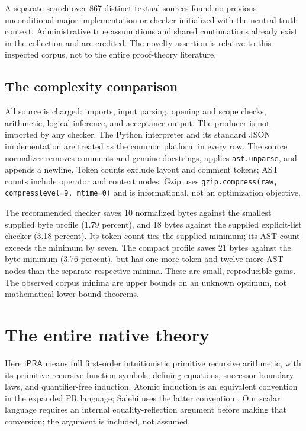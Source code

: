 \documentclass[11pt,letterpaper]{article}
\theoremstyle{definition}\newtheorem{definition}[theorem]{Definition}
\theoremstyle{remark}\newtheorem{remark}[theorem]{Remark}
\newcommand{\ipra}{\mathsf{iPRA}}
\begin{document}
A separate search over 867 distinct textual sources found no previous
unconditional-major implementation or checker initialized with the
neutral truth context. Administrative true assumptions and shared
continuations already exist in the collection and are credited. The
novelty assertion is relative to this inspected corpus, not to the entire
proof-theory literature.

\subsection{The complexity comparison}



All source is charged: imports, input parsing, opening and scope checks,
arithmetic, logical inference, and acceptance output. The producer is
not imported by any checker. The Python interpreter and its standard
JSON implementation are treated as the common platform in every row.
The source normalizer removes comments and genuine docstrings, applies
\texttt{ast.unparse}, and appends a newline. Token counts exclude layout
and comment tokens; AST counts include operator and context nodes.
Gzip uses \texttt{gzip.compress(raw, compresslevel=9, mtime=0)} and is
informational, not an optimization objective.

The recommended checker saves 10 normalized bytes against the smallest
supplied byte profile (1.79 percent), and 18 bytes against the supplied
explicit-list checker (3.18 percent). Its token count ties the supplied
minimum; its AST count exceeds the minimum by seven. The compact profile
saves 21 bytes against the byte minimum (3.76 percent), but has one more
token and twelve more AST nodes than the separate respective minima.
These are small, reproducible gains. The observed corpus minima are
upper bounds on an unknown optimum, not mathematical lower-bound theorems.

\section{The entire native theory}
\label{sec:native}

Here \(\ipra\) means full first-order intuitionistic primitive recursive
arithmetic, with its primitive-recursive function symbols, defining
equations, successor boundary laws, and quantifier-free induction.
Atomic induction is an equivalent convention in the expanded PR language;
Salehi uses the latter convention \cite{salehi}. Our scalar language
requires an internal equality-reflection argument before making that
conversion; the argument is included, not assumed.
\end{document}
